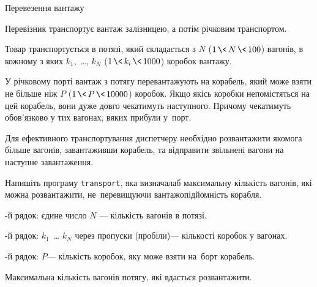 \begin{problemAllDefault}{Перевезення вантажу}

Перевізник транспортує вантаж залізницею, а потім річковим транспортом.

Товар транспортується в потязі, який складається з $N$ (${1\,{\<}\,N\,{\<}\,100}$) вагонів, в кожному з яких $k_1$,~\dots, $k_N$ (${1\,{\<}\,k_i\,{\<}\,1000}$) коробок вантажу.

У річковому порті вантаж з потягу перевантажують на корабель, який може взяти не більше ніж $P$ (${1\,{\<}\,P\,{\<}\,10000}$) коробок. Якщо якісь коробки не\nolinebreak[3] помістяться на цей корабель, вони дуже довго чекатимуть наступного. Причому чекатимуть обов'язково у тих вагонах, в\nolinebreak[3] яких прибули у~порт.

Для ефективного транспортування диспетчеру необхідно розвантажити якомога більше вагонів, завантаживши корабель, та відправити звільнені вагони на наступне завантаження.

\Task	Напишіть програму \texttt{transport}, яка визначала\nolinebreak[3] б максимальну кількість вагонів, які можна розвантажити, не~перевищуючи вантажопідйомність корабля.

-й рядок: єдине число $N$ --- кількість вагонів в потязі.

\ifAfour\else
\noindent
{}-й рядок: $k_1$~\dots{} $k_N$ через пропуски (пробіли)\nolinebreak[3] --- кількості коробок у вагонах.

\ifAfour\else
\noindent
{}-й рядок: $P$\nolinebreak[3] --- кількість коробок, яку може взяти на~борт корабель.


\OutputFile Максимальна кількість вагонів потягу, які вдасться розвантажити.

\ifAfour\else
\vspace{-0.875\baselineskip plus 0.25 ex}
\fi

\Example
\begin{exampleSimple}{5em}{3em}%
%
\end{exampleSimple}

\end{problemAllDefault}
